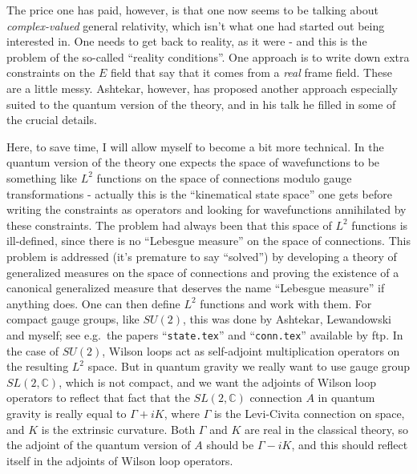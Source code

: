 \documentclass{article}
\begin{document}
The price one has paid, however, is that one now seems to be talking
about \emph{complex-valued} general relativity, which isn't what one had
started out being interested in. One needs to get back to reality, as it
were - and this is the problem of the so-called ``reality conditions''.
One approach is to write down extra constraints on the \(E\) field that
say that it comes from a \emph{real} frame field. These are a little
messy. Ashtekar, however, has proposed another approach especially
suited to the quantum version of the theory, and in his talk he filled
in some of the crucial details.

Here, to save time, I will allow myself to become a bit more technical.
In the quantum version of the theory one expects the space of
wavefunctions to be something like \(L^2\) functions on the space of
connections modulo gauge transformations - actually this is the
``kinematical state space'' one gets before writing the constraints as
operators and looking for wavefunctions annihilated by these
constraints. The problem had always been that this space of \(L^2\)
functions is ill-defined, since there is no ``Lebesgue measure'' on the
space of connections. This problem is addressed (it's premature to say
``solved'') by developing a theory of generalized measures on the space
of connections and proving the existence of a canonical generalized
measure that deserves the name ``Lebesgue measure'' if anything does.
One can then define \(L^2\) functions and work with them. For compact
gauge groups, like \(SU(2)\), this was done by Ashtekar, Lewandowski and
myself; see e.g.~the papers ``\texttt{state.tex}'' and
``\texttt{conn.tex}'' available by ftp. In the case of \(SU(2)\), Wilson
loops act as self-adjoint multiplication operators on the resulting
\(L^2\) space. But in quantum gravity we really want to use gauge group
\(SL(2,\mathbb{C})\), which is not compact, and we want the adjoints of
Wilson loop operators to reflect that fact that the \(SL(2,\mathbb{C})\)
connection \(A\) in quantum gravity is really equal to \(\Gamma + iK\),
where \(\Gamma\) is the Levi-Civita connection on space, and \(K\) is
the extrinsic curvature. Both \(\Gamma\) and \(K\) are real in the
classical theory, so the adjoint of the quantum version of \(A\) should
be \(\Gamma - iK\), and this should reflect itself in the adjoints of
Wilson loop operators.
\end{document}
